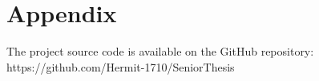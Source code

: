 \clearpage
\chapter*{Appendix}

The project source code is available on the GitHub repository: https://github.com/Hermit-1710/SeniorThesis
